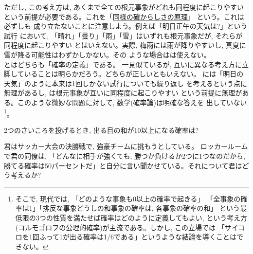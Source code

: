 ただし, この考え方は, あくまで全ての根元事象がどれも同程度に起こりやすい
という前提が必要である。これを「\underline{同様の確からしさの原理}」
という。これは必ずしも
成り立たないことに注意しよう。例えば「明日正午の天気は?」という試行
において, 「晴れ」「曇り」「雨」「雪」はいずれも根元事象だが, それらが同程度に起こりやすい
とはいえない。実際, 梅雨には雨が降りやすいし, 真夏に雪が降る可能性はわずかしかない。その
ような場合はは使えない。\\

とはどちらも「確率の定義」である。
一見似ているが, 互いに異なる考え方に立脚していることは明らかだろう。どちらが正しいともいえない。
には「明日の天気」のように本来は1回しかない試行についても繰り返し
を考えるという点に無理があるし, は根元事象が互いに同程度に起こりやすい
という前提に無理がある。このような微妙な問題に対して, 数学(確率論)は明確な答えを
出していない\footnote{そこで, 現代では, 「どのような事象も0以上の確率で起きる」
「全事象の確率は1」「排反な事象どうしの和事象の確率は, 各事象の確率の和」
という最低限の3つの性質を満たせば確率はどのように定義してもよい, という考え方
(コルモゴロフの公理的確率)が主流である。しかし, この立場では
「サイコロを1回ふって1が出る確率は1/6である」というような結論を導くことはできない。}。

\begin{q}\label{q:stat_dice2_gt10} 2つのさいころを投げるとき, 出る目の和が10以上になる確率は?
\end{q}

\begin{q}\label{q:stat_win_lose} 君はサッカー大会の決勝戦で, 強豪チームに挑もうとしている。
ロッカールームで君の同僚は, 「どんなに相手が強くても, 勝つか負けるか2つに1つなのだから, 
勝てる確率は50パーセントだ」と自分に言い聞かせている。それについて君はどう考えるか?
\end{q}
\mv

